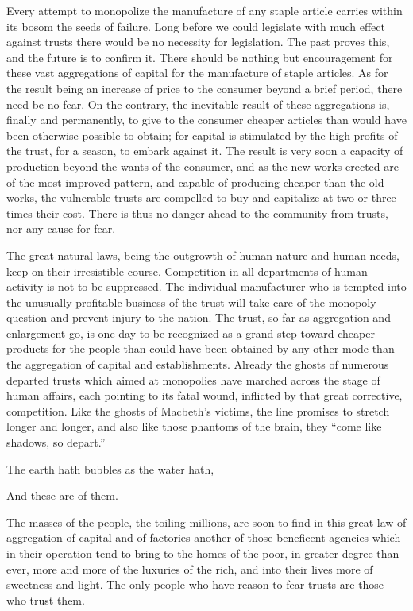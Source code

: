 \documentclass[11pt,openany]{book}
\begin{document}
Every attempt to monopolize the manufacture of any staple article carries within its bosom the seeds of failure. Long before we could legislate with much effect against trusts there would be no necessity for legislation. The past proves this, and the future is to confirm it. There should be nothing but encouragement for these vast aggregations of capital for the manufacture of staple articles. As for the result being an increase of price to the consumer beyond a brief period, there need be no fear. On the contrary, the inevitable result of these aggregations is, finally and permanently, to give to the consumer cheaper articles than would have been otherwise possible to obtain; for capital is stimulated by the high profits of the trust, for a season, to embark against it. The result is very soon a capacity of production beyond the wants of the consumer, and as the new works erected are of the most improved pattern, and capable of producing cheaper than the old works, the vulnerable trusts are compelled to buy and capitalize at two or three times their cost. There is thus no danger ahead to the community from trusts, nor any cause for fear.

The great natural laws, being the outgrowth of human nature and human needs, keep on their irresistible course. Competition in all departments of human activity is not to be suppressed. The individual manufacturer who is tempted into the unusually profitable business of the trust will take care of the monopoly question and prevent injury to the nation. The trust, so far as aggregation and enlargement go, is one day to be recognized as a grand step toward cheaper products for the people than could have been obtained by any other mode than the aggregation of capital and establishments. Already the ghosts of numerous departed trusts which aimed at monopolies have marched across the stage of human affairs, each pointing to its fatal wound, inflicted by that great corrective, competition. Like the ghosts of Macbeth's victims, the line promises to stretch longer and longer, and also like those phantoms of the brain, they ``come like shadows, so depart.''

The earth hath bubbles as the water hath,

And these are of them.

The masses of the people, the toiling millions, are soon to find in this great law of aggregation of capital and of factories another of those beneficent agencies which in their operation tend to bring to the homes of the poor, in greater degree than ever, more and more of the luxuries of the rich, and into their lives more of sweetness and light. The only people who have reason to fear trusts are those who trust them.
\end{document}
